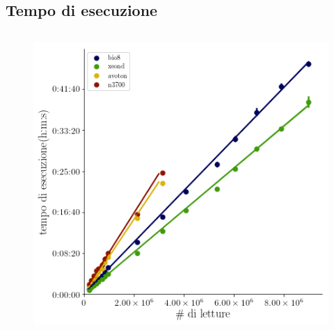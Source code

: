 \documentclass{beamer}
\begin{document}
\subsection{Tempo di esecuzione}
\begin{frame}
\begin{columns}
\begin{column}{0.8\linewidth}	
\begin{figure}[H]
\centering
\includegraphics[scale=0.5]{mapping.png}	
\label{subfig:Map}
\end{figure}
\end{column}
\end{columns}
\end{frame}
\end{document}
